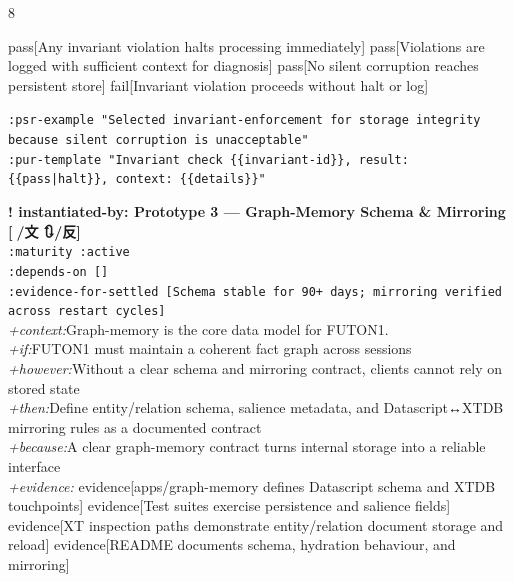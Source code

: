 \documentclass[landscape]{article}
\newcommand{\flexitag}[1]{\textcolor[gray]{0.35}{\textit{#1}}}
\newenvironment{devmapactive}{%
  \def\FrameCommand{\colorbox{devmapactivebg}}%
  \setlength{\fboxsep}{2pt}%
  \MakeFramed{\advance\hsize-\width \FrameRestore}%
}{\endMakeFramed}
\begin{document}
\begin{paracol}{8}
\begin{devmapactive}
    pass[Any invariant violation halts processing immediately] pass[Violations are logged with sufficient context for diagnosis] pass[No silent corruption reaches persistent store] fail[Invariant violation proceeds without halt or log]\\
\par
  \texttt{:\allowbreak{}psr-\allowbreak{}example "Selected invariant-\allowbreak{}enforcement for storage integrity because silent corruption is unacceptable"}\\
  \texttt{:\allowbreak{}pur-\allowbreak{}template "Invariant check \{\{invariant-\allowbreak{}id\}\},\allowbreak{} result:\allowbreak{} \{\{pass|\allowbreak{}halt\}\},\allowbreak{} context:\allowbreak{} \{\{details\}\}"}\\
\par
\par
\end{devmapactive}
\begin{devmapactive}
\textbf{! instantiated-by: Prototype 3 — Graph-Memory Schema \& Mirroring [🍵/文 🔃/反]}\\
  \texttt{:\allowbreak{}maturity :\allowbreak{}active}\\
  \texttt{:\allowbreak{}depends-\allowbreak{}on []}\\
  \texttt{:\allowbreak{}evidence-\allowbreak{}for-\allowbreak{}settled [Schema stable for 90+\allowbreak{} days;\allowbreak{} mirroring verified across restart cycles]}\\
  \flexitag{+context:}Graph-memory is the core data model for FUTON1.\\
  \flexitag{+if:}FUTON1 must maintain a coherent fact graph across sessions\\
  \flexitag{+however:}Without a clear schema and mirroring contract, clients cannot rely on stored state\\
  \flexitag{+then:}Define entity/relation schema, salience metadata, and Datascript↔XTDB mirroring rules as a documented contract\\
  \flexitag{+because:}A clear graph-memory contract turns internal storage into a reliable interface\\
  \flexitag{+evidence:} evidence[apps/graph-memory defines Datascript schema and XTDB touchpoints] evidence[Test suites exercise persistence and salience fields] evidence[XT inspection paths demonstrate entity/relation document storage and reload] evidence[README documents schema, hydration behaviour, and mirroring]\\
\par

\end{devmapactive}
\end{paracol}
\end{document}
